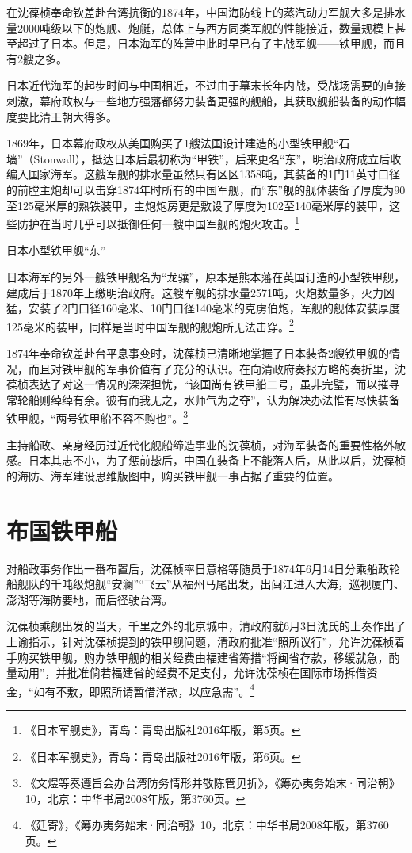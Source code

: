 \documentclass[12pt,UTF8]{ctexbook}
\begin{document}
在沈葆桢奉命钦差赴台湾抗衡的1874年，中国海防线上的蒸汽动力军舰大多是排水量2000吨级以下的炮舰、炮艇，总体上与西方同类军舰的性能接近，数量规模上甚至超过了日本。但是，日本海军的阵营中此时早已有了主战军舰——铁甲舰，而且有2艘之多。

日本近代海军的起步时间与中国相近，不过由于幕末长年内战，受战场需要的直接刺激，幕府政权与一些地方强藩都努力装备更强的舰船，其获取舰船装备的动作幅度要比清王朝大得多。

1869年，日本幕府政权从美国购买了1艘法国设计建造的小型铁甲舰“石墙”（Stonwall），抵达日本后最初称为“甲铁”，后来更名“东”，明治政府成立后收编入国家海军。这艘军舰的排水量虽然只有区区1358吨，其装备的1门11英寸口径的前膛主炮却可以击穿1874年时所有的中国军舰，而“东”舰的舰体装备了厚度为90至125毫米厚的熟铁装甲，主炮炮房更是敷设了厚度为102至140毫米厚的装甲，这些防护在当时几乎可以抵御任何一艘中国军舰的炮火攻击。\footnote{《日本军舰史》，青岛：青岛出版社2016年版，第5页。}

日本小型铁甲舰“东”

日本海军的另外一艘铁甲舰名为“龙骧”，原本是熊本藩在英国订造的小型铁甲舰，建成后于1870年上缴明治政府。这艘军舰的排水量2571吨，火炮数量多，火力凶猛，安装了2门口径160毫米、10门口径140毫米的克虏伯炮，军舰的舰体安装厚度125毫米的装甲，同样是当时中国军舰的舰炮所无法击穿。\footnote{《日本军舰史》，青岛：青岛出版社2016年版，第6页。}

1874年奉命钦差赴台平息事变时，沈葆桢已清晰地掌握了日本装备2艘铁甲舰的情况，而且对铁甲舰的军事价值有了充分的认识。在向清政府奏报方略的奏折里，沈葆桢表达了对这一情况的深深担忧，“该国尚有铁甲船二号，虽非完璧，而以摧寻常轮船则绰绰有余。彼有而我无之，水师气为之夺”，认为解决办法惟有尽快装备铁甲舰，“两号铁甲船不容不购也”。\footnote{《文煜等奏遵旨会办台湾防务情形并敬陈管见折》，《筹办夷务始末·同治朝》10，北京：中华书局2008年版，第3760页。}

主持船政、亲身经历过近代化舰船缔造事业的沈葆桢，对海军装备的重要性格外敏感。日本其志不小，为了惩前毖后，中国在装备上不能落人后，从此以后，沈葆桢的海防、海军建设思维版图中，购买铁甲舰一事占据了重要的位置。

\section{布国铁甲船}

对船政事务作出一番布置后，沈葆桢率日意格等随员于1874年6月14日分乘船政轮船舰队的千吨级炮舰“安澜”“飞云”从福州马尾出发，出闽江进入大海，巡视厦门、澎湖等海防要地，而后径驶台湾。

沈葆桢乘舰出发的当天，千里之外的北京城中，清政府就6月3日沈氏的上奏作出了上谕指示，针对沈葆桢提到的铁甲舰问题，清政府批准“照所议行”，允许沈葆桢着手购买铁甲舰，购办铁甲舰的相关经费由福建省筹措“将闽省存款，移缓就急，酌量动用”，并批准倘若福建省的经费不足支付，允许沈葆桢在国际市场拆借资金，“如有不敷，即照所请暂借洋款，以应急需”。\footnote{《廷寄》，《筹办夷务始末·同治朝》10，北京：中华书局2008年版，第3760页。}
\end{document}
